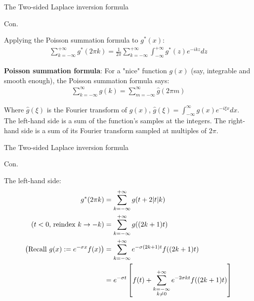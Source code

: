 \documentclass{beamer}
\begin{document}
\begin{frame}{The Two-sided Laplace inversion formula}


    {\footnotesize \scriptsize
    \par Con.
    \par Applying the Poisson summation formula to \( g^*(x) \):
    \begin{align*}
        \sum_{k=-\infty}^{+\infty} g^*(2\pi k) = \frac{1}{2\pi} \sum_{k=-\infty}^{+\infty} \int_{-\infty}^{+\infty} g^*(z)e^{-ikz} dz
    \end{align*}
    \par \textbf{Poisson summation formula}: For a "nice" function \( g(x) \) (say, integrable and smooth enough), 
    the Poisson summation formula says:
    \begin{align*}
        \sum_{k=-\infty}^{\infty} g(k) = \sum_{m=-\infty}^{\infty} \hat{g}(2\pi m)
    \end{align*}
    \par Where \(\hat{g}(\xi)\) is the Fourier transform of \( g(x)\), $\hat{g}(\xi) = \int_{-\infty}^{\infty} g(x) e^{-i\xi x} dx.$  
    The left-hand side is a sum of the function's samples at the integers.  
    The right-hand side is a sum of its Fourier transform sampled at multiples of \( 2\pi \).
    }
    
\end{frame}
\begin{frame}{The Two-sided Laplace inversion formula}


    {\footnotesize \scriptsize
    \par Con.
    \par The left-hand side:
    \begin{align*}
        g^*(2\pi k) & = \sum_{k=-\infty}^{+\infty} g(t + 2|t|k) \\
        \left(\text{$t<0$, reindex $k \rightarrow -k$}\right)&= \sum_{k=-\infty}^{+\infty} g((2k + 1)t)\\
        \left(\text{Recall \( g(x) := e^{-\sigma x} f(x) \)}\right)&=\sum_{k=-\infty}^{+\infty} e^{-\sigma(2k+1)t} f((2k + 1)t)\\
        & = e^{-\sigma t} \left[ f(t) + \sum_{\substack{k=-\infty \\ k\neq 0}}^{+\infty} e^{-2\sigma kt} f((2k + 1)t) \right]
    \end{align*}
    }
    
\end{frame}
\end{document}
